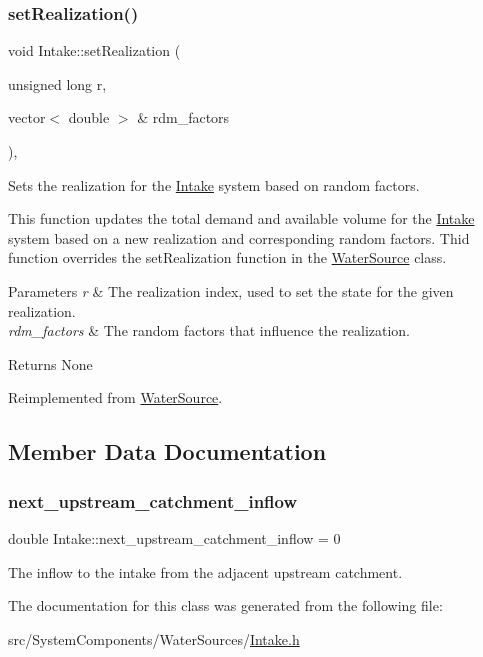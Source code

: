 \subsubsection{\texorpdfstring{set\+Realization()}{setRealization()}}
{\footnotesize\ttfamily void Intake\+::set\+Realization (\begin{DoxyParamCaption}\item[{unsigned long}]{r,  }\item[{vector$<$ double $>$ \&}]{rdm\+\_\+factors }\end{DoxyParamCaption})\hspace{0.3cm}{\ttfamily [override]}, {\ttfamily [virtual]}}



Sets the realization for the \mbox{\hyperlink{classIntake}{Intake}} system based on random factors. 

This function updates the total demand and available volume for the \mbox{\hyperlink{classIntake}{Intake}} system based on a new realization and corresponding random factors. Thid function overrides the set\+Realization function in the \mbox{\hyperlink{classWaterSource}{Water\+Source}} class.


\begin{DoxyParams}{Parameters}
{\em r} & The realization index, used to set the state for the given realization. \\
\hline
{\em rdm\+\_\+factors} & The random factors that influence the realization.\\
\hline
\end{DoxyParams}
\begin{DoxyReturn}{Returns}
None 
\end{DoxyReturn}


Reimplemented from \mbox{\hyperlink{classWaterSource_a634904c510b16de6d7c057fed6d6e625}{Water\+Source}}.



\subsection{Member Data Documentation}
\mbox{\label{classIntake_a5d28f8899e9d4d61983ad8fdf7d58373}} 
\subsubsection{\texorpdfstring{next\+\_\+upstream\+\_\+catchment\+\_\+inflow}{next\_upstream\_catchment\_inflow}}
{\footnotesize\ttfamily double Intake\+::next\+\_\+upstream\+\_\+catchment\+\_\+inflow = 0}



The inflow to the intake from the adjacent upstream catchment. 



The documentation for this class was generated from the following file\+:\begin{DoxyCompactItemize}
\item 
src/\+System\+Components/\+Water\+Sources/\mbox{\hyperlink{Intake_8h}{Intake.\+h}}\end{DoxyCompactItemize}
